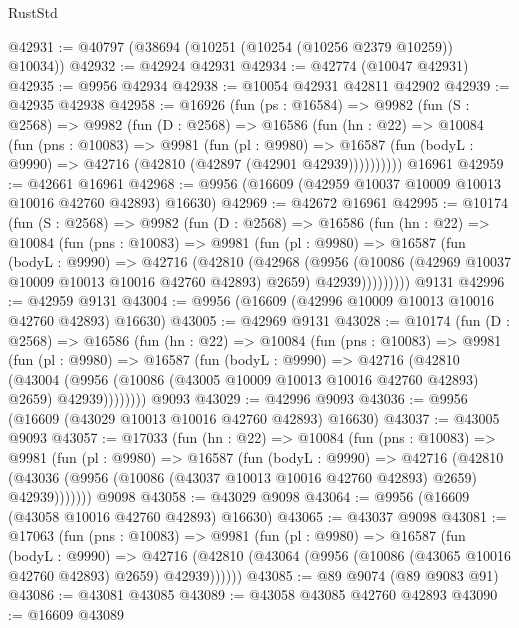 \begin{lexlean}{RustStd}
\begin{coremodule}
@42931 := @40797 (@38694 (@10251 (@10254 (@10256 @2379 @10259)) @10034))
@42932 := @42924 @42931
@42934 := @42774 (@10047 @42931)
@42935 := @9956 @42934
@42938 := @10054 @42931 @42811 @42902
@42939 := @42935 @42938
@42958 := @16926
    (fun (ps : @16584) =>
    @9982
      (fun (S : @2568) =>
      @9982
        (fun (D : @2568) =>
        @16586
          (fun (hn : @22) =>
          @10084
            (fun (pns : @10083) =>
            @9981
              (fun (pl : @9980) =>
              @16587 (fun (bodyL : @9990) => @42716 (@42810 (@42897 (@42901 @42939))))))))))
    @16961
@42959 := @42661 @16961
@42968 := @9956 (@16609 (@42959 @10037 @10009 @10013 @10016 @42760 @42893) @16630)
@42969 := @42672 @16961
@42995 := @10174
    (fun (S : @2568) =>
    @9982
      (fun (D : @2568) =>
      @16586
        (fun (hn : @22) =>
        @10084
          (fun (pns : @10083) =>
          @9981
            (fun (pl : @9980) =>
            @16587
              (fun (bodyL : @9990) =>
              @42716
                (@42810
                  (@42968
                    (@9956
                      (@10086 (@42969 @10037 @10009 @10013 @10016 @42760 @42893) @2659)
                      @42939)))))))))
    @9131
@42996 := @42959 @9131
@43004 := @9956 (@16609 (@42996 @10009 @10013 @10016 @42760 @42893) @16630)
@43005 := @42969 @9131
@43028 := @10174
    (fun (D : @2568) =>
    @16586
      (fun (hn : @22) =>
      @10084
        (fun (pns : @10083) =>
        @9981
          (fun (pl : @9980) =>
          @16587
            (fun (bodyL : @9990) =>
            @42716
              (@42810
                (@43004
                  (@9956 (@10086 (@43005 @10009 @10013 @10016 @42760 @42893) @2659) @42939))))))))
    @9093
@43029 := @42996 @9093
@43036 := @9956 (@16609 (@43029 @10013 @10016 @42760 @42893) @16630)
@43037 := @43005 @9093
@43057 := @17033
    (fun (hn : @22) =>
    @10084
      (fun (pns : @10083) =>
      @9981
        (fun (pl : @9980) =>
        @16587
          (fun (bodyL : @9990) =>
          @42716
            (@42810 (@43036 (@9956 (@10086 (@43037 @10013 @10016 @42760 @42893) @2659) @42939)))))))
    @9098
@43058 := @43029 @9098
@43064 := @9956 (@16609 (@43058 @10016 @42760 @42893) @16630)
@43065 := @43037 @9098
@43081 := @17063
    (fun (pns : @10083) =>
    @9981
      (fun (pl : @9980) =>
      @16587
        (fun (bodyL : @9990) =>
        @42716 (@42810 (@43064 (@9956 (@10086 (@43065 @10016 @42760 @42893) @2659) @42939))))))
@43085 := @89 @9074 (@89 @9083 @91)
@43086 := @43081 @43085
@43089 := @43058 @43085 @42760 @42893
@43090 := @16609 @43089

\end{coremodule}
\end{lexlean}
